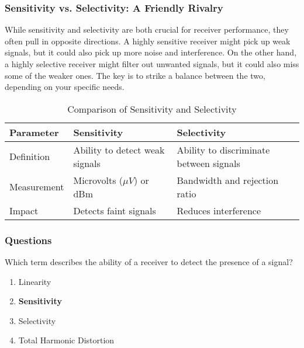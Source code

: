 \subsubsection*{Sensitivity vs. Selectivity: A Friendly Rivalry}
While sensitivity and selectivity are both crucial for receiver performance, they often pull in opposite directions. A highly sensitive receiver might pick up weak signals, but it could also pick up more noise and interference. On the other hand, a highly selective receiver might filter out unwanted signals, but it could also miss some of the weaker ones. The key is to strike a balance between the two, depending on your specific needs.



\begin{table}[h]
    \centering
    \begin{tabular}{|l|l|l|}
        \hline
        \textbf{Parameter} & \textbf{Sensitivity} & \textbf{Selectivity} \\
        \hline
        Definition & Ability to detect weak signals & Ability to discriminate between signals \\
        \hline
        Measurement & Microvolts ($\mu V$) or dBm & Bandwidth and rejection ratio \\
        \hline
        Impact & Detects faint signals & Reduces interference \\
        \hline
    \end{tabular}
    \caption{Comparison of Sensitivity and Selectivity}
    \label{tab:sensitivity-selectivity}
\end{table}

\subsubsection{Questions}

\begin{tcolorbox}[colback=gray!10!white,colframe=black!75!black,title={T7A01}]
    Which term describes the ability of a receiver to detect the presence of a signal?
    \begin{enumerate}[label=\Alph*),noitemsep]
        \item Linearity
        \item \textbf{Sensitivity}
        \item Selectivity
        \item Total Harmonic Distortion
    \end{enumerate}
\end{tcolorbox}

